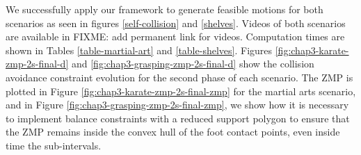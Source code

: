 We successfully apply our framework to generate feasible motions for
both scenarios as seen in figures \ref{self-collision} and
\ref{shelves}. Videos of both scenarios are available in FIXME: add
permanent link for videos. Computation times are shown in Tables
\ref{table-martial-art} and \ref{table-shelves}. Figures
\ref{fig:chap3-karate-zmp-2s-final-d} and
\ref{fig:chap3-grasping-zmp-2s-final-d} show the collision avoidance
constraint evolution for the second phase of each scenario. The ZMP is
plotted in Figure \ref{fig:chap3-karate-zmp-2s-final-zmp} for the
martial arts scenario, and in Figure
\ref{fig:chap3-grasping-zmp-2s-final-zmp}, we show how it is necessary
to implement balance constraints with a reduced support polygon to
ensure that the ZMP remains inside the convex hull of the foot contact
points, even inside time the sub-intervals.

